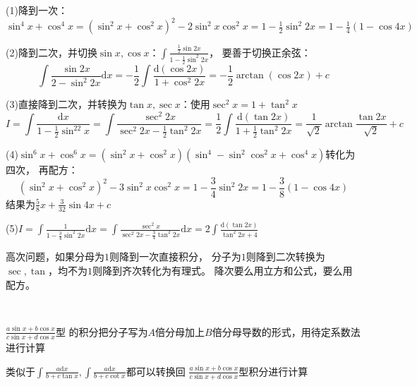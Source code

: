 \begin{solution}
  (1)降到一次：$\sin^4 x + \cos^4 x = (\sin^2 x + \cos^2 x)^2 - 2 \sin^2 x \cos^2 x = 1 - \frac{1}{2}\sin^2 2x = 1 - \frac{1}{4}(1 - \cos 4x)$

  (2)降到二次，并切换$\sin x, \cos x$：$\int \frac{\frac{1}{2}\sin 2x}{1 - \frac{1}{2} \sin^2 2x}$，
  要善于切换正余弦：
  \begin{equation*}
    \int \frac{\sin 2x}{2 - \sin^2 2x} \mathrm{d} x = -\frac{1}{2}\int \frac{\mathrm{d}(\cos 2x)}{1 + \cos^2 2x} = - \frac{1}{2}\arctan (\cos 2x) + c
  \end{equation*}

  (3)直接降到二次，并转换为$\tan x, \sec x$：使用$\sec^2 x = 1 + \tan ^2 x$
  \begin{equation*}
    I = \int \frac{\mathrm{d} x}{1 - \frac{1}{2}\sin^22x} = \int \frac{\sec^2 2x}{\sec^2 2x - \frac{1}{2} \tan^2 2x} = \frac{1}{2} \int \frac{\mathrm{d}(\tan 2x)}{1 + \frac{1}{2} \tan^2 2x} = \frac{1}{\sqrt{2}} \arctan \frac{\tan 2x}{\sqrt{2}} + c
  \end{equation*}

  (4)$\sin^6 x + \cos^6 x = (\sin^2 x + \cos^2 x)(\sin^4 - \sin^2 \cos^2 x + \cos^4 x)$转化为四次，
  再配方：
  \begin{equation*}
    (\sin^2 x + \cos^2 x)^2 - 3 \sin^2 x \cos^2 x = 1 - \frac{3}{4} \sin^2 2x = 1 - \frac{3}{8} \left( 1 - \cos 4x \right)
  \end{equation*}
  结果为$\frac{5}{8}x + \frac{3}{32} \sin 4x + c$

  (5)$I = \int \frac{1}{1 - \frac{3}{4} \sin^2 2x}\mathrm{d} x = \int \frac{\sec^2 x}{\sec^2 2x - \frac{3}{4}\tan^2 2x}\mathrm{d} x = 2 \int \frac{\mathrm{d}(\tan 2x)}{\tan^2 2x + 4}$
\end{solution}


\begin{note}
  高次问题，如果分母为$1$则降到一次直接积分，
  分子为$1$则降到二次转换为$\sec, \tan$，均不为$1$则降到齐次转化为有理式。
  降次要么用立方和公式，要么用配方。
\end{note}

~


\begin{theorem}
  $\frac{a\sin x + b\cos x}{c \sin x + d\cos x}$型
  的积分把分子写为$A$倍分母加上$B$倍分母导数的形式，用待定系数法进行计算
\end{theorem}

\begin{corollary}
  类似于$\int \frac{a\mathrm{d} x}{b + c\tan x}, \int \frac{a \mathrm{d} x}{b + c \cot x}$都可以转换回
  $\frac{a \sin x + b \cos x }{c \sin x + d \cos x}$型积分进行计算
\end{corollary}

